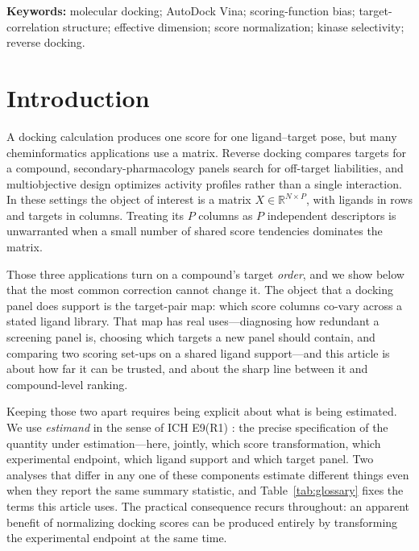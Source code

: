 \documentclass[11pt]{article}
\begin{document}
\begin{abstract}
\medskip\noindent\textbf{Scientific Contribution.}
We quantify molecular-size-domain non-transport and support-specific recovery of docking
target-correlation maps, and identify a scale-free nuisance-projection failure in validating fitted
component maps. We also make explicit that within-ligand centring cannot alter target order and
identify unequal target scaling as the operation that breaks this invariance.
\end{abstract}

\noindent\textbf{Keywords:} molecular docking; AutoDock Vina; scoring-function bias;
target-correlation structure; effective dimension; score normalization; kinase selectivity;
reverse docking.

\section{Introduction}

A docking calculation produces one score for one ligand--target pose, but many
cheminformatics applications use a matrix. Reverse docking compares targets for a compound,
secondary-pharmacology panels search for off-target liabilities, and multiobjective design
optimizes activity profiles rather than a single interaction. In these settings the object
of interest is a matrix $X\in\mathbb{R}^{N\times P}$, with ligands in rows and targets in
columns. Treating its $P$ columns as $P$ independent descriptors is unwarranted when a
small number of shared score tendencies dominates the matrix.

Those three applications turn on a compound's target \emph{order}, and we show below that
the most common correction cannot change it. The object that a docking panel does support is
the target-pair map: which score columns co-vary across a stated ligand library. That map has
real uses---diagnosing how redundant a screening panel is, choosing which targets a new panel
should contain, and comparing two scoring set-ups on a shared ligand support---and this
article is about how far it can be trusted, and about the sharp line between it and
compound-level ranking.

Keeping those two apart requires being explicit about what is being estimated. We use
\emph{estimand} in the sense of ICH E9(R1) \cite{ich2019estimand}: the precise specification
of the quantity under estimation---here, jointly, which score transformation, which
experimental endpoint, which ligand support and which target panel. Two analyses that differ
in any one of these components estimate different things even when they report the same
summary statistic, and Table~\ref{tab:glossary} fixes the terms this article uses.
The practical consequence recurs throughout: an apparent benefit of normalizing docking
scores can be produced entirely by transforming the experimental endpoint at the same time.
\end{document}
